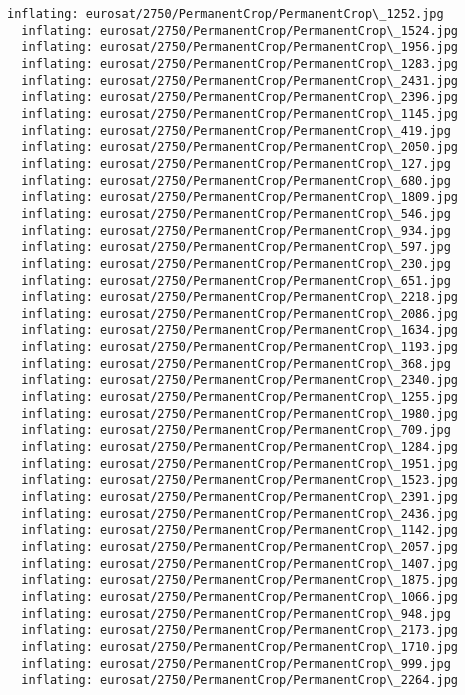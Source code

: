 \documentclass[11pt]{article}
\begin{document}
\begin{Verbatim}[commandchars=\\\{\}]
  inflating: eurosat/2750/PermanentCrop/PermanentCrop\_1252.jpg
  inflating: eurosat/2750/PermanentCrop/PermanentCrop\_1524.jpg
  inflating: eurosat/2750/PermanentCrop/PermanentCrop\_1956.jpg
  inflating: eurosat/2750/PermanentCrop/PermanentCrop\_1283.jpg
  inflating: eurosat/2750/PermanentCrop/PermanentCrop\_2431.jpg
  inflating: eurosat/2750/PermanentCrop/PermanentCrop\_2396.jpg
  inflating: eurosat/2750/PermanentCrop/PermanentCrop\_1145.jpg
  inflating: eurosat/2750/PermanentCrop/PermanentCrop\_419.jpg
  inflating: eurosat/2750/PermanentCrop/PermanentCrop\_2050.jpg
  inflating: eurosat/2750/PermanentCrop/PermanentCrop\_127.jpg
  inflating: eurosat/2750/PermanentCrop/PermanentCrop\_680.jpg
  inflating: eurosat/2750/PermanentCrop/PermanentCrop\_1809.jpg
  inflating: eurosat/2750/PermanentCrop/PermanentCrop\_546.jpg
  inflating: eurosat/2750/PermanentCrop/PermanentCrop\_934.jpg
  inflating: eurosat/2750/PermanentCrop/PermanentCrop\_597.jpg
  inflating: eurosat/2750/PermanentCrop/PermanentCrop\_230.jpg
  inflating: eurosat/2750/PermanentCrop/PermanentCrop\_651.jpg
  inflating: eurosat/2750/PermanentCrop/PermanentCrop\_2218.jpg
  inflating: eurosat/2750/PermanentCrop/PermanentCrop\_2086.jpg
  inflating: eurosat/2750/PermanentCrop/PermanentCrop\_1634.jpg
  inflating: eurosat/2750/PermanentCrop/PermanentCrop\_1193.jpg
  inflating: eurosat/2750/PermanentCrop/PermanentCrop\_368.jpg
  inflating: eurosat/2750/PermanentCrop/PermanentCrop\_2340.jpg
  inflating: eurosat/2750/PermanentCrop/PermanentCrop\_1255.jpg
  inflating: eurosat/2750/PermanentCrop/PermanentCrop\_1980.jpg
  inflating: eurosat/2750/PermanentCrop/PermanentCrop\_709.jpg
  inflating: eurosat/2750/PermanentCrop/PermanentCrop\_1284.jpg
  inflating: eurosat/2750/PermanentCrop/PermanentCrop\_1951.jpg
  inflating: eurosat/2750/PermanentCrop/PermanentCrop\_1523.jpg
  inflating: eurosat/2750/PermanentCrop/PermanentCrop\_2391.jpg
  inflating: eurosat/2750/PermanentCrop/PermanentCrop\_2436.jpg
  inflating: eurosat/2750/PermanentCrop/PermanentCrop\_1142.jpg
  inflating: eurosat/2750/PermanentCrop/PermanentCrop\_2057.jpg
  inflating: eurosat/2750/PermanentCrop/PermanentCrop\_1407.jpg
  inflating: eurosat/2750/PermanentCrop/PermanentCrop\_1875.jpg
  inflating: eurosat/2750/PermanentCrop/PermanentCrop\_1066.jpg
  inflating: eurosat/2750/PermanentCrop/PermanentCrop\_948.jpg
  inflating: eurosat/2750/PermanentCrop/PermanentCrop\_2173.jpg
  inflating: eurosat/2750/PermanentCrop/PermanentCrop\_1710.jpg
  inflating: eurosat/2750/PermanentCrop/PermanentCrop\_999.jpg
  inflating: eurosat/2750/PermanentCrop/PermanentCrop\_2264.jpg

\end{Verbatim}
\end{document}
